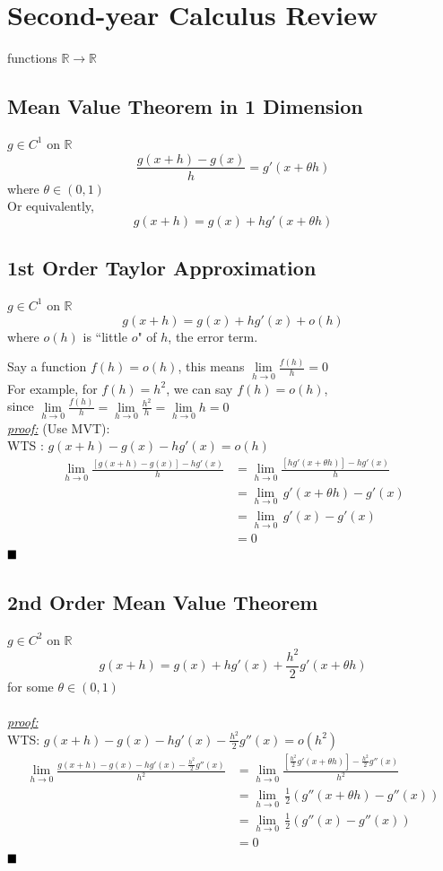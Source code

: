 \documentclass[11pt]{article}
\newcommand{\real}[0]{\mathbb{R}}
\newcommand{\proof}[0]{\textit{\underline{proof:} }}
\newcommand{\qed}[0]{$\hfill\blacksquare$}
\begin{document}
\section{Second-year Calculus Review}
functions $\real \rightarrow \real$
\subsection{Mean Value Theorem in 1 Dimension}
$g \in C^1$ on $\real$
$$\frac{g(x+h) - g(x)}{h} = g'(x + \theta h)$$
where $\theta \in (0,1)$ \\
Or equivalently,
$$g(x+h) = g(x) + hg'(x+\theta h)$$

\subsection{1st Order Taylor Approximation}
$g \in C^1$ on $\real$
$$g(x + h) = g(x) + hg'(x) + o(h)$$
where $o(h)$ is ``little $o$" of $h$, the error term.

\noindent Say a function $f(h) = o(h)$, this means $\underset{h \rightarrow 0}{\lim} \frac{f(h)}{h} = 0$\\
For example, for $f(h) = h^2$, we can say $f(h) = o(h)$, \\
since $\underset{h \rightarrow 0}{\lim} \frac{f(h)}{h} = \underset{h \rightarrow 0}{\lim} \frac{h^2}{h} = \underset{h \rightarrow 0}{\lim} h = 0$\\
\proof (Use MVT): \\
WTS : $g(x+h) - g(x) - hg'(x) = o(h)$
\begin{align*}
	\underset{h \rightarrow 0}{\lim} \frac{[g(x+h) - g(x)] - hg'(x)}{h} &= \underset{h \rightarrow 0}{\lim} \frac{[hg'(x+\theta h)] - hg'(x)}{h} \\
	&=\underset{h \rightarrow 0}{\lim} \, g'(x + \theta h) - g'(x) \\
	&=\underset{h \rightarrow 0}{\lim} \, g'(x) - g'(x) \\
	&= 0
\end{align*}
\qed

\subsection{2nd Order Mean Value Theorem}
$g \in C^2$ on $\real$
$$g(x + h) = g(x) + hg'(x) + \frac{h^2}{2} g'(x+\theta h)$$
for some $\theta \in (0,1)$ \\\\
\proof \\
WTS: $g(x+h) - g(x) - hg'(x) - \frac{h^2}{2}g''(x) = o(h^2)$
\begin{align*}
	\underset{h \rightarrow 0}{\lim} \frac{g(x+h) - g(x) - hg'(x) - \frac{h^2}{2}g''(x)}{h^2}
	&= \underset{h \rightarrow 0}{\lim} \frac{[\frac{h^2}{2}g'(x+\theta h)] - \frac{h^2}{2}g''(x)}{h^2}\\
	&=\underset{h \rightarrow 0}{\lim}\, \frac{1}{2}(g''(x+\theta h) - g''(x)) \\
	&=\underset{h \rightarrow 0}{\lim}\, \frac{1}{2}(g''(x) - g''(x)) \\
	&= 0
\end{align*}
\qed
\end{document}
